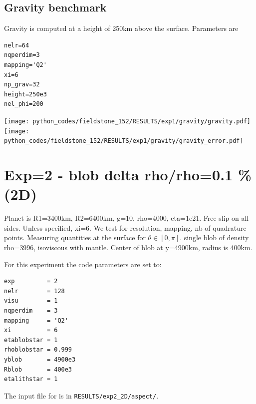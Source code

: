 \newpage
\subsection*{Gravity benchmark}

Gravity is computed at a height of 250km above the surface. 
Parameters are 
\begin{lstlisting}
nelr=64
nqperdim=3
mapping='Q2'
xi=6
np_grav=32
height=250e3
nel_phi=200
\end{lstlisting}

\begin{center}
\texttt{[image: python\_codes/fieldstone\_152/RESULTS/exp1/gravity/gravity.pdf]}
\texttt{[image: python\_codes/fieldstone\_152/RESULTS/exp1/gravity/gravity\_error.pdf]}
\end{center}








\newpage
\section*{Exp=2 - blob delta rho/rho=0.1 \% (2D)}

Planet is R1=3400km, R2=6400km, g=10, rho=4000, eta=1e21.
Free slip on all sides. Unless specified, xi=6.
We test for resolution, mapping, nb of quadrature points.
Measuring quantities at the surface for $\theta\in[0,\pi]$.
single blob of density rho=3996, isoviscous with mantle.
Center of blob at y=4900km, radius is 400km.

For this experiment the code parameters are set to:
\begin{lstlisting}
exp         = 2
nelr        = 128 
visu        = 1
nqperdim    = 3
mapping     = 'Q2' 
xi          = 6
etablobstar = 1
rhoblobstar = 0.999
yblob       = 4900e3
Rblob       = 400e3
etalithstar = 1
\end{lstlisting}

The input file for \aspect{} is in {\tt RESULTS/exp2\_2D/aspect/}.


